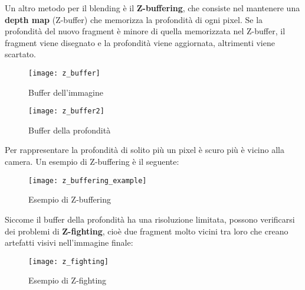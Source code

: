 \documentclass[a4paper]{article}
\begin{document}
\vspace{1em}
\noindent
Un altro metodo per il blending è il \textbf{Z-buffering}, che consiste nel mantenere
una \textbf{depth map} (Z-buffer) che memorizza la profondità di ogni pixel. Se la
profondità del nuovo fragment è minore di quella memorizzata nel Z-buffer, il fragment
viene disegnato e la profondità viene aggiornata, altrimenti viene scartato.
\begin{figure}[H]
  \centering
  \begin{minipage}{0.48\textwidth}
     \centering
     \texttt{[image: z\_buffer]}
     \caption{Buffer dell'immagine}
   \end{minipage}\hfill
   \begin{minipage}{0.48\textwidth}
     \centering
     \texttt{[image: z\_buffer2]}
     \caption{Buffer della profondità}
   \end{minipage}
\end{figure}
Per rappresentare la profondità di solito più un pixel è scuro più è vicino alla camera.
Un esempio di Z-buffering è il seguente:
\begin{figure}[H]
  \centering
  \texttt{[image: z\_buffering\_example]}
  \caption{Esempio di Z-buffering}
\end{figure}

\vspace{1em}
\noindent
Siccome il buffer della profondità ha una risoluzione limitata, possono verificarsi
dei problemi di \textbf{Z-fighting}, cioè due fragment molto vicini tra loro che
creano artefatti visivi nell'immagine finale:
\begin{figure}[H]
  \centering
  \texttt{[image: z\_fighting]}
  \caption{Esempio di Z-fighting}
\end{figure}
\end{document}
